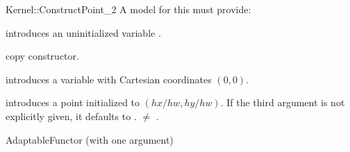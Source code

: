 \begin{ccRefFunctionObjectConcept}{Kernel::ConstructPoint_2}
A model for this must provide:



\ccHidden {}
             {introduces an uninitialized variable .}

\ccHidden {}
            {copy constructor.}

            {introduces a variable  with Cartesian coordinates
              $(0,0)$.}

\ccHidden{}
            {introduces a point  initialized to $(hx/hw,hy/hw)$.
             If the third argument is not explicitly given, it defaults
             to .
             \ccPrecond {} $\neq$ . }

\ccRefines
AdaptableFunctor (with one argument)

\ccSeeAlso
{} \\

\end{ccRefFunctionObjectConcept}
